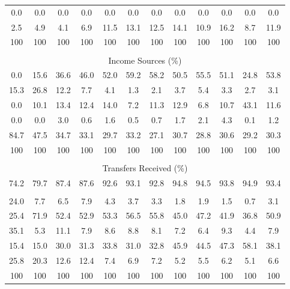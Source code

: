 \begin{tabular}{c c c| c c c c c| c c c| c}
0.0 & 0.0 & 0.0 & 0.0 & 0.0 & 0.0 & 0.0 & 0.0 & 0.0 & 0.0 & 0.0 & 0.0 \\
2.5 & 4.9 & 4.1 & 6.9 & 11.5 & 13.1 & 12.5 & 14.1 & 10.9 & 16.2 & 8.7 & 11.9 \\
\midrule
100 & 100 & 100 & 100 & 100 & 100 & 100 & 100 & 100 & 100 & 100 & 100 \\
\midrule \\
\multicolumn{12}{c}{Income Sources (\%)}  \\
\midrule
0.0 & 15.6 & 36.6 & 46.0 & 52.0 & 59.2 & 58.2 & 50.5 & 55.5 & 51.1 & 24.8 & 53.8 \\
15.3 & 26.8 & 12.2 & 7.7 & 4.1 & 1.3 & 2.1 & 3.7 & 5.4 & 3.3 & 2.7 & 3.1 \\
0.0 & 10.1 & 13.4 & 12.4 & 14.0 & 7.2 & 11.3 & 12.9 & 6.8 & 10.7 & 43.1 & 11.6 \\
0.0 & 0.0 & 3.0 & 0.6 & 1.6 & 0.5 & 0.7 & 1.7 & 2.1 & 4.3 & 0.1 & 1.2 \\
84.7 & 47.5 & 34.7 & 33.1 & 29.7 & 33.2 & 27.1 & 30.7 & 28.8 & 30.6 & 29.2 & 30.3 \\
\midrule
100 & 100 & 100 & 100 & 100 & 100 & 100 & 100 & 100 & 100 & 100 & 100 \\
\midrule \\
\multicolumn{12}{c}{Transfers Received (\%)}  \\
\midrule
74.2 & 79.7 & 87.4 & 87.6 & 92.6 & 93.1 & 92.8 & 94.8 & 94.5 & 93.8 & 94.9 & 93.4 \\
 & & & & & & & & & & &  \\
24.0 & 7.7 & 6.5 & 7.9 & 4.3 & 3.7 & 3.3 & 1.8 & 1.9 & 1.5 & 0.7 & 3.1 \\
25.4 & 71.9 & 52.4 & 52.9 & 53.3 & 56.5 & 55.8 & 45.0 & 47.2 & 41.9 & 36.8 & 50.9 \\
35.1 & 5.3 & 11.1 & 7.9 & 8.6 & 8.8 & 8.1 & 7.2 & 6.4 & 9.3 & 4.4 & 7.9 \\
15.4 & 15.0 & 30.0 & 31.3 & 33.8 & 31.0 & 32.8 & 45.9 & 44.5 & 47.3 & 58.1 & 38.1 \\
25.8 & 20.3 & 12.6 & 12.4 & 7.4 & 6.9 & 7.2 & 5.2 & 5.5 & 6.2 & 5.1 & 6.6 \\
\midrule
100 & 100 & 100 & 100 & 100 & 100 & 100 & 100 & 100 & 100 & 100 & 100 \\
\bottomrule
\end{tabular}